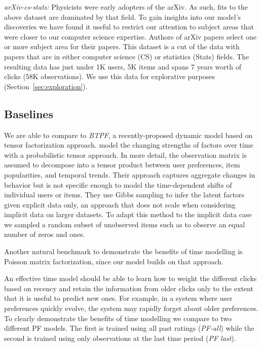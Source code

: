 \documentclass{sig-alternate}
\begin{document}
\emph{arXiv-cs-stats:} Physicists were early adopters of the arXiv. As such,
fits to the above dataset are dominated by that field. To gain insights into
our model's discoveries we have found it useful to restrict our attention to
subject areas that were closer to our computer science expertise. Authors of
arXiv papers select one or more subject area for their papers. This dataset
is a cut of the data with papers that are in either computer science (CS) or
statistics (Stats) fields. The resulting data has just under 1K users, 5K items
and spans 7 years worth of clicks (58K observations).  We use this data for
explorative purposes (Section~\ref{sec:exploration}). 

\subsection{Baselines}
\label{sec:baselines}
\noindent
We are able to compare to \emph{BTPF}, a recently-proposed dynamic model based
on tensor factorization approach. \citet{lxiong:10:bptf} model the changing
strengths of factors over time with a probabilistic tensor approach. In
more detail, the observation matrix is assumed to decompose into a tensor
product between user preferences, item popularities, and temporal trends. Their
approach captures aggregate changes in behavior but is not specific enough to
model the time-dependent shifts of individual users or items. They use Gibbs
sampling to infer the latent factors given explicit data only, an approach that
does not scale when considering implicit data on larger datasets. To adapt this
method to the implicit data case we sampled a random subset of unobserved
items such as to observe an equal number of zeros and ones.  

Another natural benchmark to demonstrate the benefits of time modelling is Poisson
matrix factorization, since our model builds on that approach. 

An effective time model should be able to learn how to weight the different
clicks based on recency and retain the information from older clicks only to
the extent that it is useful to predict new ones.  For example, in a system
where user preferences quickly evolve, the system may rapidly forget about
older preferences. To clearly demonstrate the benefits of time modelling we
compare to two different PF models. The first is trained using all past ratings
(\emph{PF-all}) while the second is trained using only observations at the last
time period (\emph{PF last}). 
\end{document}
